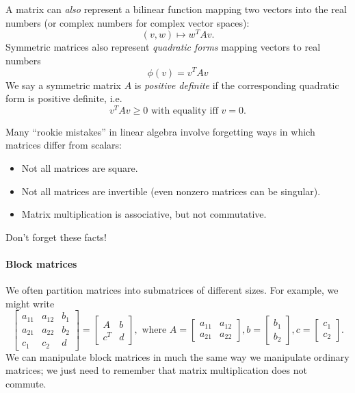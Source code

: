 \documentclass[12pt, leqno]{article}
\begin{document}
A matrix can {\em also} represent a bilinear function mapping
two vectors into the real numbers (or complex numbers for complex
vector spaces):
\[
  (v,w) \mapsto w^T A v.
\]
Symmetric matrices also represent {\em quadratic forms}
mapping vectors to real numbers
\[
  \phi(v) = v^T A v
\]
We say a symmetric matrix $A$ is {\em positive definite} if
the corresponding quadratic form is positive definite, i.e.
\[
  v^T A v \geq 0 \mbox{ with equality iff } v = 0.
\]

Many ``rookie mistakes'' in linear algebra involve forgetting
ways in which matrices differ from scalars:
\begin{itemize}
\item
  Not all matrices are square.
\item
  Not all matrices are invertible (even nonzero matrices can be
  singular).
\item
  Matrix multiplication is associative, but not commutative.
\end{itemize}
Don't forget these facts!

\paragraph{Block matrices}
We often partition matrices into submatrices of different
sizes.  For example, we might write
\[
  \begin{bmatrix}
    a_{11} & a_{12} & b_1 \\
    a_{21} & a_{22} & b_2 \\
    c_1 & c_2 & d
  \end{bmatrix} =
  \begin{bmatrix}
    A & b \\
    c^T & d
  \end{bmatrix}, \mbox{ where }
  A = \begin{bmatrix} a_{11} & a_{12} \\ a_{21} & a_{22} \end{bmatrix},
  b = \begin{bmatrix} b_1 \\ b_2 \end{bmatrix},
  c = \begin{bmatrix} c_1 \\ c_2 \end{bmatrix}.
\]
We can manipulate block matrices in much the same way we manipulate
ordinary matrices; we just need to remember that matrix multiplication
does not commute.
\end{document}

